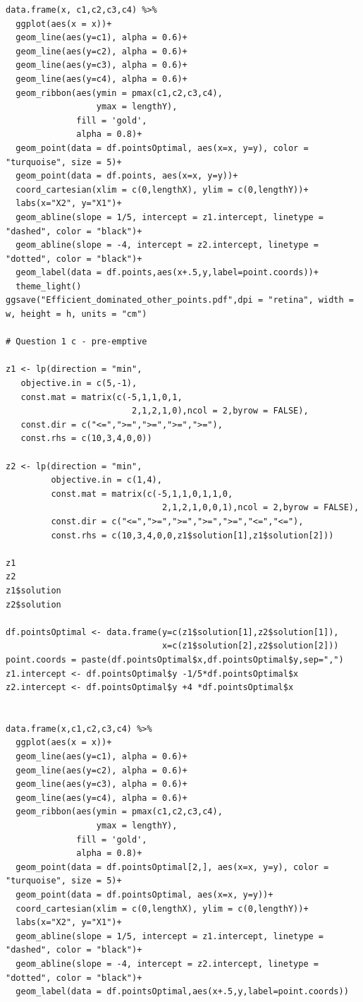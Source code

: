 \documentclass[a4paper,11pt]{article}
\begin{document}
\begin{verbatim}
data.frame(x, c1,c2,c3,c4) %>% 
  ggplot(aes(x = x))+
  geom_line(aes(y=c1), alpha = 0.6)+
  geom_line(aes(y=c2), alpha = 0.6)+
  geom_line(aes(y=c3), alpha = 0.6)+
  geom_line(aes(y=c4), alpha = 0.6)+
  geom_ribbon(aes(ymin = pmax(c1,c2,c3,c4),
                  ymax = lengthY),
              fill = 'gold', 
              alpha = 0.8)+
  geom_point(data = df.pointsOptimal, aes(x=x, y=y), color = "turquoise", size = 5)+
  geom_point(data = df.points, aes(x=x, y=y))+
  coord_cartesian(xlim = c(0,lengthX), ylim = c(0,lengthY))+
  labs(x="X2", y="X1")+
  geom_abline(slope = 1/5, intercept = z1.intercept, linetype = "dashed", color = "black")+
  geom_abline(slope = -4, intercept = z2.intercept, linetype = "dotted", color = "black")+
  geom_label(data = df.points,aes(x+.5,y,label=point.coords))+
  theme_light()
ggsave("Efficient_dominated_other_points.pdf",dpi = "retina", width = w, height = h, units = "cm")

# Question 1 c - pre-emptive

z1 <- lp(direction = "min",
   objective.in = c(5,-1),
   const.mat = matrix(c(-5,1,1,0,1,
                         2,1,2,1,0),ncol = 2,byrow = FALSE),
   const.dir = c("<=",">=",">=",">=",">="),
   const.rhs = c(10,3,4,0,0))

z2 <- lp(direction = "min",
         objective.in = c(1,4),
         const.mat = matrix(c(-5,1,1,0,1,1,0,
                               2,1,2,1,0,0,1),ncol = 2,byrow = FALSE),
         const.dir = c("<=",">=",">=",">=",">=","<=","<="),
         const.rhs = c(10,3,4,0,0,z1$solution[1],z1$solution[2]))

z1
z2
z1$solution
z2$solution

df.pointsOptimal <- data.frame(y=c(z1$solution[1],z2$solution[1]),
                               x=c(z1$solution[2],z2$solution[2]))
point.coords = paste(df.pointsOptimal$x,df.pointsOptimal$y,sep=",")
z1.intercept <- df.pointsOptimal$y -1/5*df.pointsOptimal$x
z2.intercept <- df.pointsOptimal$y +4 *df.pointsOptimal$x


data.frame(x,c1,c2,c3,c4) %>% 
  ggplot(aes(x = x))+
  geom_line(aes(y=c1), alpha = 0.6)+
  geom_line(aes(y=c2), alpha = 0.6)+
  geom_line(aes(y=c3), alpha = 0.6)+
  geom_line(aes(y=c4), alpha = 0.6)+
  geom_ribbon(aes(ymin = pmax(c1,c2,c3,c4),
                  ymax = lengthY),
              fill = 'gold', 
              alpha = 0.8)+
  geom_point(data = df.pointsOptimal[2,], aes(x=x, y=y), color = "turquoise", size = 5)+
  geom_point(data = df.pointsOptimal, aes(x=x, y=y))+
  coord_cartesian(xlim = c(0,lengthX), ylim = c(0,lengthY))+
  labs(x="X2", y="X1")+
  geom_abline(slope = 1/5, intercept = z1.intercept, linetype = "dashed", color = "black")+
  geom_abline(slope = -4, intercept = z2.intercept, linetype = "dotted", color = "black")+
  geom_label(data = df.pointsOptimal,aes(x+.5,y,label=point.coords))


\end{verbatim}
\end{document}
